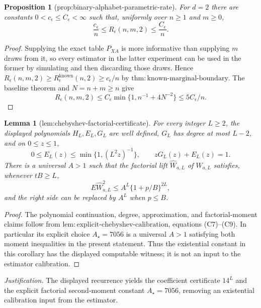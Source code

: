 \documentclass{article}
\newtheorem{lemma}{Lemma}
\newtheorem{proposition}{Proposition}
\begin{document}
\begin{proposition}[prop:binary-alphabet-parametric-rate]\label{prop:binary-alphabet-parametric-rate}
For \(d=2\) there are constants \(0<c_\epsilon\le C_\epsilon<\infty\) such that, uniformly over \(n\ge1\) and \(m\ge0\),
\[
 \frac{c_\epsilon}{n}\le R_\epsilon(n,m,2)\le\frac{C_\epsilon}{n}.
\]
\end{proposition}
\begin{proof}
Supplying the exact table \(P_{XA}\) is more informative than supplying \(m\) draws from it, so every estimator in the latter experiment can be used in the former by simulating and then discarding those draws.  Hence \(R_\epsilon(n,m,2)\ge R_\epsilon^{\mathrm{known}}(n,2)\ge c_\epsilon/n\) by \(\mathrm{thm:known\mbox{-}marginal\mbox{-}boundary}\).  The baseline theorem and \(N=n+m\ge n\) give
\[
 R_\epsilon(n,m,2)\le C_\epsilon\min\{1,n^{-1}+4N^{-2}\}\le5C_\epsilon/n.
\]
\end{proof}

\begin{lemma}[lem:chebyshev-factorial-certificate]\label{lem:chebyshev-factorial-certificate}
For every integer \(L\ge2\), the displayed polynomials \(H_L,E_L,G_L\) are well defined, \(G_L\) has degree at most \(L-2\), and on \(0\le z\le1\),
\[
 0\le E_L(z)\le\min\{1,(L^2z)^{-1}\},\qquad zG_L(z)+E_L(z)=1.
\]
There is a universal \(A>1\) such that the factorial lift \(\widehat W_{a,L}\) of \(W_{a,L}\) satisfies, whenever \(tB\ge L\),
\[
 E\widehat W_{a,L}^{2}\le A^L\{1+p/B\}^{2L},
\]
and the right side can be replaced by \(A^L\) when \(p\le B\).
\end{lemma}
\begin{proof}
The polynomial continuation, degree, approximation, and factorial-moment claims follow from \(\mathrm{lem:explicit\mbox{-}chebyshev\mbox{-}calibration}\), equations (C7)--(C9).  In particular its explicit choice \(A_\star=7056\) is a universal \(A>1\) satisfying both moment inequalities in the present statement.  Thus the existential constant in this corollary has the displayed computable witness; it is not an input to the estimator calibration.
\end{proof}
\par\smallskip\noindent \textit{Justification.} The displayed recurrence yields the coefficient certificate \(14^L\) and the explicit factorial second-moment constant \(A_\star=7056\), removing an existential calibration input from the estimator.
\end{document}
